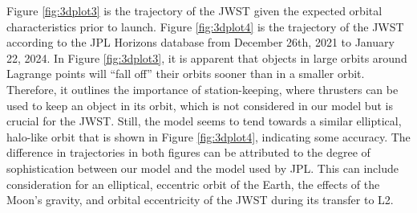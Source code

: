 Figure \ref{fig:3dplot3} is the trajectory of the JWST given the expected orbital characteristics prior to launch\autocite{JWSTHaloOrbit}.
Figure \ref{fig:3dplot4} is the trajectory of the JWST according to the JPL Horizons database from December 26th, 2021 to January 22, 2024\autocite{SEHaloOrbit}.
In Figure \ref{fig:3dplot3}, it is apparent that objects in large orbits around Lagrange points will ``fall off'' their orbits sooner than in a smaller orbit.
Therefore, it outlines the importance of station-keeping, where thrusters can be used to keep an object in its orbit, which is not considered in our model but is crucial for the JWST.
Still, the model seems to tend towards a similar elliptical, halo-like orbit that is shown in Figure \ref{fig:3dplot4}, indicating some accuracy.
The difference in trajectories in both figures can be attributed to the degree of sophistication between our model and the model used by JPL.
This can include consideration for an elliptical, eccentric orbit of the Earth, the effects of the Moon's gravity, and orbital eccentricity of the JWST during its transfer to L2.